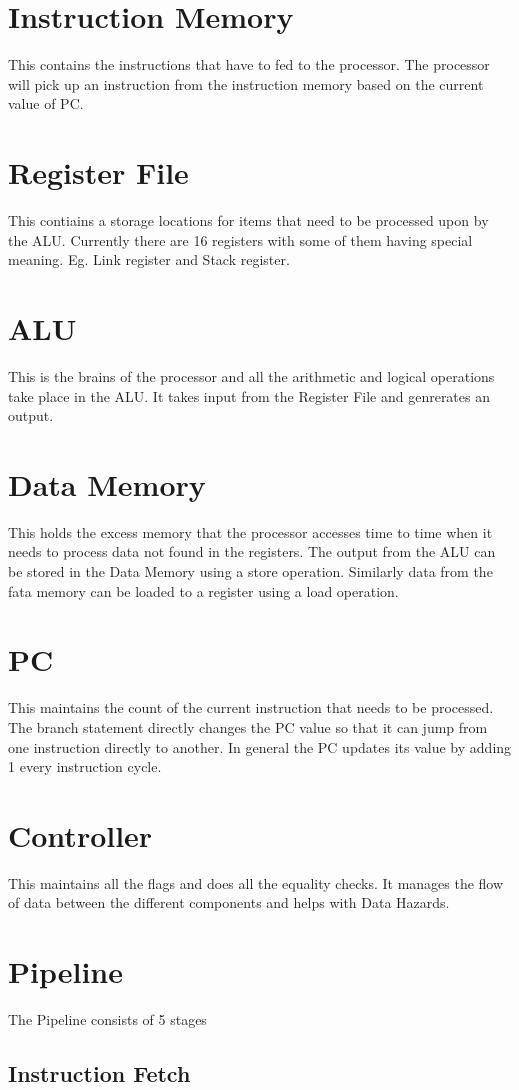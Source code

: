 \documentclass{scrreprt}
\begin{document}
\section{Instruction Memory}
This contains the instructions that have to fed to the processor. The processor will pick up an instruction from the instruction memory based on the current value of PC.
\section{Register File}
This contiains a storage locations for items that need to be processed upon by the ALU. Currently there are 16 registers with some of them having special meaning. Eg. Link register and Stack register.
\section{ALU}
This is the brains of the processor and all the arithmetic and logical operations take place in the ALU. It takes input from the Register File and genrerates an output.
\section{Data Memory}
This holds the excess memory that the processor accesses time to time when it needs to process data not found in the registers. The output from the ALU can be stored in the Data Memory using a store operation. Similarly data from the fata memory can be loaded to a register using a load operation.
\section{PC}
This maintains the count of the current instruction that needs to be processed. The branch statement directly changes the PC value so that it can jump from one instruction directly to another. In general the PC updates its value by adding 1 every instruction cycle.
\section{Controller}
This maintains all the flags and does all the equality checks. It manages the flow of data between the different components and helps with Data Hazards.

\section{Pipeline}
The Pipeline consists of 5 stages
\subsection{Instruction Fetch}
\end{document}
